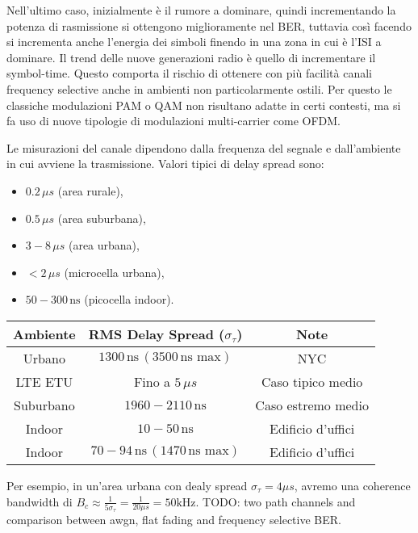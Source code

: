 Nell'ultimo caso, inizialmente è il rumore a dominare, quindi incrementando la potenza di rasmissione si ottengono miglioramente nel BER, tuttavia così facendo si incrementa anche l'energia dei simboli finendo in una zona in cui è l'ISI a dominare.
Il trend delle nuove generazioni radio è quello di incrementare il symbol-time. Questo comporta il rischio di ottenere con più facilità canali frequency selective anche in ambienti non particolarmente ostili. Per questo le classiche modulazioni PAM o QAM non risultano adatte in certi contesti, ma si fa uso di nuove tipologie di modulazioni multi-carrier come OFDM.


Le misurazioni del canale dipendono dalla frequenza del segnale e dall'ambiente in cui avviene la trasmissione.
Valori tipici di delay spread sono:

\begin{itemize}
    \item $0.2 \, \mu s$ (area rurale),
    \item $0.5 \, \mu s$ (area suburbana),
    \item $3-8 \, \mu s$ (area urbana),
    \item $<2 \, \mu s$ (microcella urbana),
    \item $50-300 \, \text{ns}$ (picocella indoor).
\end{itemize}

\begin{center}
    \begin{tabular}{|c|c|c|}
        \hline
        \textbf{Ambiente} & \textbf{RMS Delay Spread ($\sigma_\tau$)} & \textbf{Note} \\
        \hline
        Urbano & $1300 \, \text{ns} \, (3500 \, \text{ns max})$ & NYC \\
        LTE ETU & Fino a $5 \, \mu s$ & Caso tipico medio \\
        Suburbano & $1960-2110 \, \text{ns}$ & Caso estremo medio \\
        Indoor & $10-50 \, \text{ns}$ & Edificio d'uffici \\
        Indoor & $70-94 \, \text{ns} \, (1470 \, \text{ns max})$ & Edificio d'uffici \\
        \hline
    \end{tabular}
\end{center}


Per esempio, in un'area urbana con dealy spread $\sigma_\tau = 4 \mu s$, avremo una coherence bandwidth di $B_c \approx \frac{1}{5 \sigma_\tau} = \frac{1}{20 \mu s} = 50 \text{kHz}$.
TODO: two path channels and comparison between awgn, flat fading and frequency selective BER.

